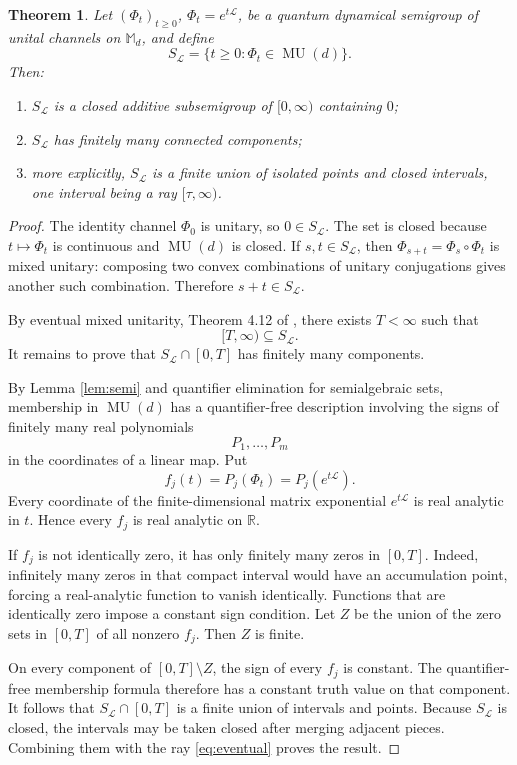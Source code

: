 \documentclass[11pt]{article}
\newtheorem{theorem}{Theorem}
\newcommand{\R}{\mathbb R}
\newcommand{\M}{\mathbb M}
\newcommand{\MU}{\operatorname{MU}}
\begin{document}
\begin{theorem}\label{thm:main}
Let \((\Phi_t)_{t\ge0}\), \(\Phi_t=e^{t\mathcal L}\), be a quantum
dynamical semigroup of unital channels on \(\M_d\), and define
\[
 S_{\mathcal L}
 =
 \{t\ge0:\Phi_t\in\MU(d)\}.
 \tag{3}\label{eq:times}
\]
Then:
\begin{enumerate}
\item \(S_{\mathcal L}\) is a closed additive subsemigroup of
      \([0,\infty)\) containing \(0\);
\item \(S_{\mathcal L}\) has finitely many connected components;
\item more explicitly, \(S_{\mathcal L}\) is a finite union of isolated
      points and closed intervals, one interval being a ray
      \([\tau,\infty)\).
\end{enumerate}
\end{theorem}

\begin{proof}
The identity channel \(\Phi_0\) is unitary, so \(0\in S_{\mathcal L}\).
The set is closed because \(t\mapsto\Phi_t\) is continuous and \(\MU(d)\) is
closed. If \(s,t\in S_{\mathcal L}\), then
\(\Phi_{s+t}=\Phi_s\circ\Phi_t\) is mixed unitary: composing two convex
combinations of unitary conjugations gives another such combination.
Therefore \(s+t\in S_{\mathcal L}\).

By eventual mixed unitarity, Theorem 4.12 of \cite{BD}, there exists
\(T<\infty\) such that
\[
 [T,\infty)\subseteq S_{\mathcal L}.
 \tag{4}\label{eq:eventual}
\]
It remains to prove that \(S_{\mathcal L}\cap[0,T]\) has finitely many
components.

By Lemma \ref{lem:semi} and quantifier elimination for semialgebraic sets,
membership in \(\MU(d)\) has a quantifier-free description involving the
signs of finitely many real polynomials
\[
 P_1,\ldots,P_m
\]
in the coordinates of a linear map. Put
\[
 f_j(t)=P_j(\Phi_t)=P_j(e^{t\mathcal L}).
\]
Every coordinate of the finite-dimensional matrix exponential
\(e^{t\mathcal L}\) is real analytic in \(t\). Hence every \(f_j\) is real
analytic on \(\R\).

If \(f_j\) is not identically zero, it has only finitely many zeros in
\([0,T]\). Indeed, infinitely many zeros in that compact interval would have
an accumulation point, forcing a real-analytic function to vanish
identically. Functions that are identically zero impose a constant sign
condition. Let \(Z\) be the union of the zero sets in \([0,T]\) of all
nonzero \(f_j\). Then \(Z\) is finite.

On every component of \([0,T]\setminus Z\), the sign of every \(f_j\) is
constant. The quantifier-free membership formula therefore has a constant
truth value on that component. It follows that
\(S_{\mathcal L}\cap[0,T]\) is a finite union of intervals and points.
Because \(S_{\mathcal L}\) is closed, the intervals may be taken closed
after merging adjacent pieces. Combining them with the ray
\eqref{eq:eventual} proves the result.
\end{proof}
\end{document}
